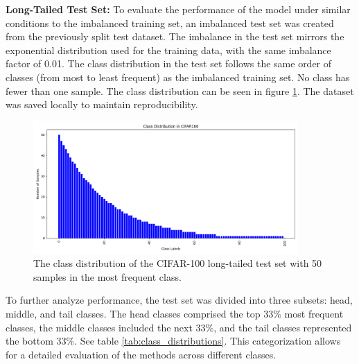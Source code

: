 \textbf{Long-Tailed Test Set:} To evaluate the performance of the model under similar conditions to the imbalanced training set, an imbalanced test set was created from the previously split test dataset. The imbalance in the test set mirrors the exponential distribution used for the training data, with the same imbalance factor of 0.01. The class distribution in the test set follows the same order of classes (from most to least frequent) as the imbalanced training set. No class has fewer than one sample. The class distribution can be seen in figure \ref{fig:cifar100_test_imb}. The dataset was saved locally to maintain reproducibility.


\begin{figure}[h!]
    \centering
    \includegraphics[width=0.9\textwidth]{Images/Plots/cifar100_test_imb.png}
    \caption{The class distribution of the CIFAR-100 long-tailed test set with 50 samples in the most frequent class.}
    \label{fig:cifar100_test_imb}
\end{figure}

To further analyze performance, the test set was divided into three subsets: head, middle, and tail classes. The head classes comprised the top 33\% most frequent classes, the middle classes included the next 33\%, and the tail classes represented the bottom 33\%. See table \ref{tab:class_distributions}. This categorization allows for a detailed evaluation of the methods across different classes. 




